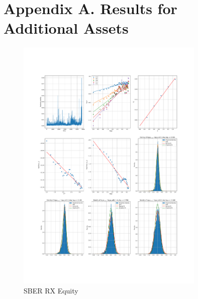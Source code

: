 
\section*{Appendix A. Results for Additional Assets}
    \noindent
    \begin{figure}[h]
        \centering
        \includegraphics[width=0.8\textwidth]{fig/SBER RX Equity.pdf}
        \caption{SBER RX Equity}
    \end{figure}

